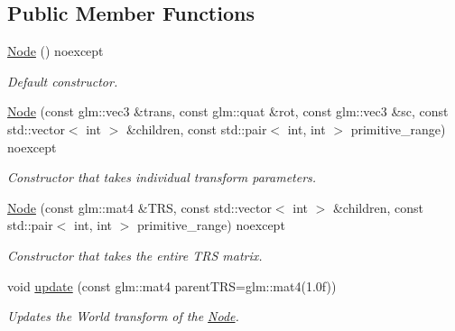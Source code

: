 \subsection*{Public Member Functions}
\begin{DoxyCompactItemize}
\item 
\hyperlink{structblaze_1_1Node_a80efd9604109b4b9ddbc72b462e35759}{Node} () noexcept
\begin{DoxyCompactList}\small\item\em Default constructor. \end{DoxyCompactList}\item 
\hyperlink{structblaze_1_1Node_a43d19db1208c11f1d2dd4195b699ab43}{Node} (const glm\+::vec3 \&trans, const glm\+::quat \&rot, const glm\+::vec3 \&sc, const std\+::vector$<$ int $>$ \&children, const std\+::pair$<$ int, int $>$ primitive\+\_\+range) noexcept
\begin{DoxyCompactList}\small\item\em Constructor that takes individual transform parameters. \end{DoxyCompactList}\item 
\hyperlink{structblaze_1_1Node_ae46aaa123fd42d14f915b7a656449862}{Node} (const glm\+::mat4 \&T\+RS, const std\+::vector$<$ int $>$ \&children, const std\+::pair$<$ int, int $>$ primitive\+\_\+range) noexcept
\begin{DoxyCompactList}\small\item\em Constructor that takes the entire T\+RS matrix. \end{DoxyCompactList}\item 
void \hyperlink{structblaze_1_1Node_aae2c0b30b1abb4b0314d2cabdbb867ed}{update} (const glm\+::mat4 parent\+T\+RS=glm\+::mat4(1.\+0f))
\begin{DoxyCompactList}\small\item\em Updates the World transform of the \hyperlink{structblaze_1_1Node}{Node}. \end{DoxyCompactList}\end{DoxyCompactItemize}
